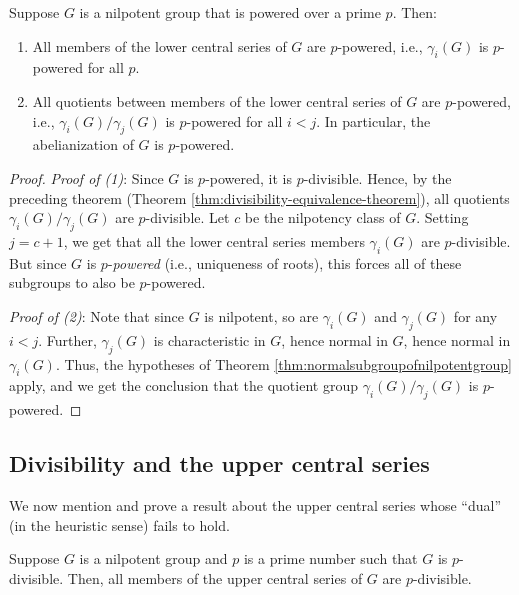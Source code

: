 \begin{theorem}\label{thm:powering-lcs}
  Suppose $G$ is a nilpotent group that is powered over a prime
  $p$. Then:

  \begin{enumerate}
  \item All members of the lower central series of $G$ are
    $p$-powered, i.e., $\gamma_i(G)$ is $p$-powered for all $p$.
  \item All quotients between members of the lower central series of
    $G$ are $p$-powered, i.e., $\gamma_i(G)/\gamma_j(G)$ is
    $p$-powered for all $i < j$. In particular, the abelianization of
    $G$ is $p$-powered.
  \end{enumerate}
\end{theorem}

\begin{proof}
  {\em Proof of (1)}: Since $G$ is $p$-powered, it is
  $p$-divisible. Hence, by the preceding theorem (Theorem
  \ref{thm:divisibility-equivalence-theorem}), all quotients
  $\gamma_i(G)/\gamma_j(G)$ are $p$-divisible. Let $c$ be the
  nilpotency class of $G$. Setting $j = c + 1$, we get that all the
  lower central series members $\gamma_i(G)$ are $p$-divisible. But
  since $G$ is $p$-{\em powered} (i.e., uniqueness of roots), this
  forces all of these subgroups to also be $p$-powered.

  {\em Proof of (2)}: Note that since $G$ is nilpotent, so are
  $\gamma_i(G)$ and $\gamma_j(G)$ for any $i < j$. Further,
  $\gamma_j(G)$ is characteristic in $G$, hence normal in $G$, hence
  normal in $\gamma_i(G)$. Thus, the hypotheses of Theorem
  \ref{thm:normalsubgroupofnilpotentgroup} apply, and we get the
  conclusion that the quotient group $\gamma_i(G)/\gamma_j(G)$ is
  $p$-powered.
\end{proof}

\subsection{Divisibility and the upper central series}

We now mention and prove a result about the upper central series whose
``dual'' (in the heuristic sense) fails to hold.

\begin{theorem}\label{thm:divisibility-upper-central-series}
  Suppose $G$ is a nilpotent group and $p$ is a prime number such that
  $G$ is $p$-divisible. Then, all members of the upper central series
  of $G$ are $p$-divisible.
\end{theorem}

